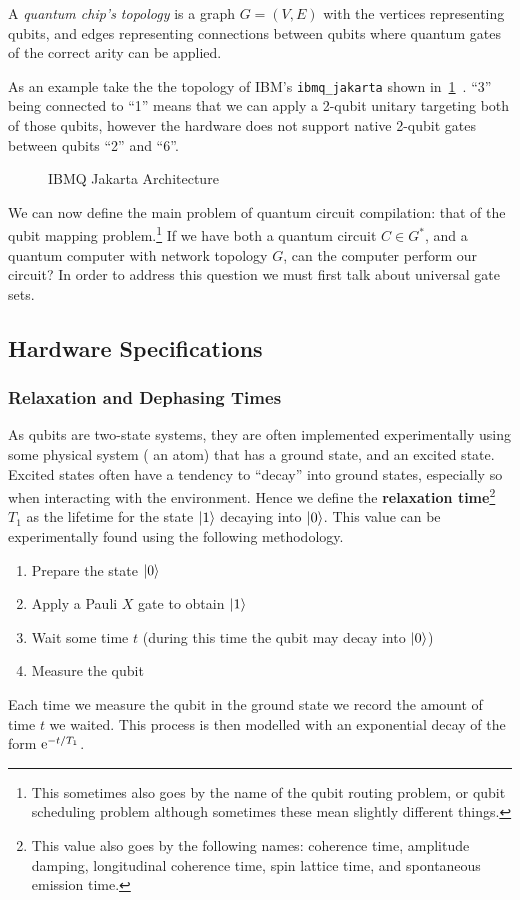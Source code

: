 \begin{definition}
    A \emph{quantum chip's topology} is a graph $G = (V, E)$ with the vertices representing qubits, and edges representing connections between qubits where quantum gates of the correct arity can be applied.
\end{definition}

As an example take the the topology of IBM's \texttt{ibmq\_jakarta} shown in~\ref{fig:ibm-jakarta}~\cite{ibmq}.
``3'' being connected to ``1'' means that we can apply a 2-qubit unitary targeting both of those qubits, however the hardware does not support native 2-qubit gates between qubits ``2'' and ``6''.
\begin{figure}[ht]
    \centering
    
    \caption{IBMQ Jakarta Architecture}\label{fig:ibm-jakarta}
\end{figure}

We can now define the main problem of quantum circuit compilation: that of the qubit mapping problem.\footnote{This sometimes also goes by the name of the qubit routing problem, or qubit scheduling problem although sometimes these mean slightly different things.}
If we have both a quantum circuit $C\in G^*$, and a quantum computer with network topology $G$, can the computer perform our circuit?
In order to address this question we must first talk about universal gate sets.


\subsection{Hardware Specifications}

\subsubsection{Relaxation and Dephasing Times}

As qubits are two-state systems, they are often implemented experimentally using some physical system (\eg{} an atom) that has a ground state, and an excited state.
Excited states often have a tendency to ``decay'' into ground states, especially so when interacting with the environment.
Hence we define the \textbf{relaxation time}\footnote{This value also goes by the following names: coherence time, amplitude damping, longitudinal coherence time, spin lattice time, and spontaneous emission time.} $T_1$ as the lifetime for the state $\ket{1}$ decaying into $\ket{0}$.
This value can be experimentally found using the following methodology.
\begin{enumerate}
    \item Prepare the state $\ket{0}$
    \item Apply a Pauli $X$ gate to obtain $\ket{1}$
    \item Wait some time $t$ (during this time the qubit may decay into $\ket{0}$)
    \item Measure the qubit
\end{enumerate}
Each time we measure the qubit in the ground state we record the amount of time $t$ we waited.
This process is then modelled with an exponential decay of the form $\mathrm{e}^{-t/T_1}$.

